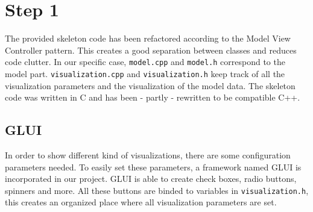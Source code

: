 \section*{Step 1}
    The provided skeleton code has been refactored according to the Model View Controller pattern. This creates a good separation between classes and reduces code clutter. In our specific case, \texttt{model.cpp} and \texttt{model.h} correspond to the model part. \texttt{visualization.cpp} and \texttt{visualization.h} keep track of all the visualization parameters and the visualization of the model data.
    The skeleton code was written in C and has been - partly - rewritten to be compatible C++.

    \subsection*{GLUI}
        In order to show different kind of visualizations, there are some configuration parameters needed. To easily set these parameters, a framework named GLUI \cite{glui} is incorporated in our project. GLUI is able to create check boxes, radio buttons, spinners and more. All these buttons are binded to variables in \texttt{visualization.h}, this creates an organized place where all visualization parameters are set.
